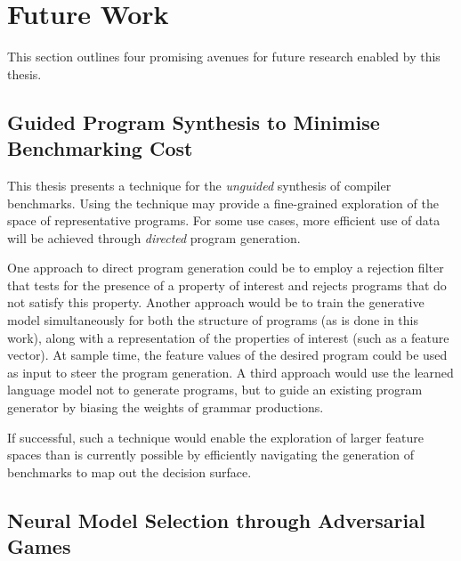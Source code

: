 \section{Future Work}
\label{sec:conclusions-future-work}

This section outlines four promising avenues for future research enabled by this thesis.

\subsection{Guided Program Synthesis to Minimise Benchmarking Cost}

This thesis presents a technique for the \emph{unguided} synthesis of compiler benchmarks. Using the technique may provide a fine-grained exploration of the space of representative programs. For some use cases, more efficient use of data will be achieved through \emph{directed} program generation.

One approach to direct program generation could be to employ a rejection filter that tests for the presence of a property of interest and rejects programs that do not satisfy this property. Another approach would be to train the generative model simultaneously for both the structure of programs (as is done in this work), along with a representation of the properties of interest (such as a feature vector). At sample time, the feature values of the desired program could be used as input to steer the program generation. A third approach would use the learned language model not to generate programs, but to guide an existing program generator by biasing the weights of grammar productions.

If successful, such a technique would enable the exploration of larger feature spaces than is currently possible by efficiently navigating the generation of benchmarks to map out the decision surface. 


\subsection{Neural Model Selection through Adversarial Games}

